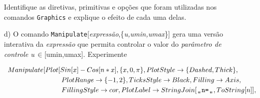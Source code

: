 \documentclass[11pt]{article}
\begin{document}
\begin{itemize}
    
        
        
        
   
    
   
   
    
   
  Identifique as diretivas, primitivas e op\c{c}\~oes que foram utilizadas nos comandos \texttt{Graphics} e explique o efeito de cada uma delas.
 

 
      \item[d)]   O comando \texttt{Manipulate}[\textsl{express\~ao},\{\textsl{u,umin,umax}\}] gera uma vers\~ao interativa da \textsl{express\~ao} que permita controlar o valor do \textsl{par\^ametro de controle} \textsl{u}$\,\in$[umin,umax]. Experimente
   
   
   \[\begin{array}{l}   
         Manipulate[Plot[Sin[x]-Cos[n\ast x], \{x, 0, \pi\},
  PlotStyle \rightarrow \{Dashed, Thick\},
  
                    \vspace{1mm}
\\  
  
\qquad \qquad  \qquad  \qquad PlotRange \rightarrow \{-1, 2\},
 TicksStyle  \rightarrow  Black,
  Filling  \rightarrow  Axis,
  
  
                      \vspace{1mm}
\\  
  
\qquad \qquad  \qquad \qquad 
FillingStyle \rightarrow  cor,
  PlotLabel  \rightarrow  StringJoin[ \texttt{\char"0D}\!\! \texttt{\char"0D}\texttt{n=} \texttt{\char"0D}\!\! \texttt{\char"0D}, ToString[n]],


\end{array}\]
\end{itemize}
\end{document}
